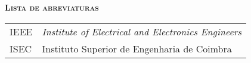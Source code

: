 
\vspace*{45pt}
\begin{flushleft}
	{\Large \textbf{\scshape{Lista de abreviaturas}}}
\end{flushleft}
\vspace*{20pt}

\begin{tabular}{l l}
    IEEE	&  \textit{Institute of Electrical and Electronics Engineers}\\
    ISEC    &  Instituto Superior de Engenharia de Coimbra\\
\end{tabular}

